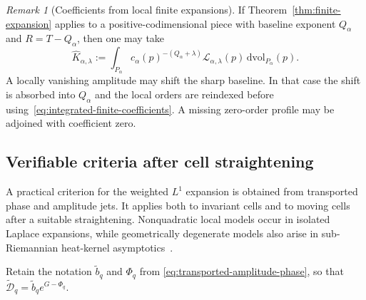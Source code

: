 \documentclass[11pt]{amsart}
\numberwithin{equation}{section}
\theoremstyle{definition}
\theoremstyle{remark}
\newtheorem{remark}[theorem]{Remark}
\newcommand{\dvol}{\,\mathrm{dvol}}
\newcommand{\cD}{\mathcal{D}}
\newcommand{\cL}{\mathcal{L}}
\begin{document}
\begin{remark}[Coefficients from local finite expansions]
\label{rem:integrated-finite-coefficients}
If Theorem~\ref{thm:finite-expansion} applies to a positive-codimensional piece
with baseline exponent $Q_\alpha$ and $R=T-Q_\alpha$, then one may take
\begin{equation}\label{eq:integrated-finite-coefficients}
 \widehat K_{\alpha,\lambda}
 :=\int_{P_\alpha}
 c_\alpha(p)^{-(Q_\alpha+\lambda)}
 \cL_{\alpha,\lambda}(p)\dvol_{P_\alpha}(p).
\end{equation}
A locally vanishing amplitude may shift the sharp baseline.  In that case the
shift is absorbed into $Q_\alpha$ and the local orders are reindexed before
using~\eqref{eq:integrated-finite-coefficients}.  A missing zero-order profile
may be adjoined with coefficient zero.
\end{remark}

\subsection{Verifiable criteria after cell straightening}

A practical criterion for the weighted $L^1$ expansion is obtained from
transported phase and amplitude jets.  It applies both to invariant cells and
to moving cells after a suitable straightening.  Nonquadratic local models occur in isolated Laplace expansions, while
geometrically degenerate models also arise in sub-Riemannian heat-kernel
asymptotics~\cite{Kirwin,NeelSacchelli}.

Retain the notation $\widetilde b_q$ and $\Phi_q$ from
\eqref{eq:transported-amplitude-phase}, so that
$\widetilde{\cD}_q=\widetilde b_q e^{G-\Phi_q}$.
\end{document}
